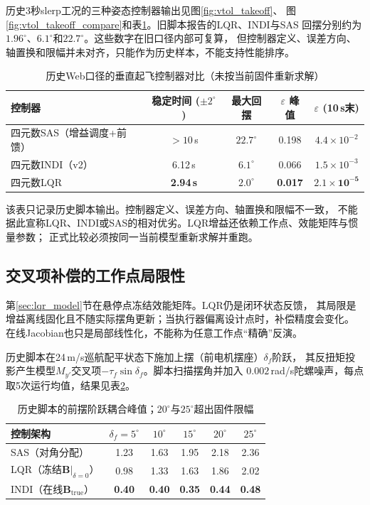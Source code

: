 历史3秒slerp工况的三种姿态控制器输出见图\ref{fig:vtol_takeoff}、
图\ref{fig:vtol_takeoff_compare}和表\ref{tab:ctrl_compare}。旧脚本报告的LQR、INDI与SAS
回摆分别约为$1.96^\circ$、$6.1^\circ$和$22.7^\circ$。这些数字在旧口径内部可复算，
但控制器定义、误差方向、轴置换和限幅并未对齐，只能作为历史样本，不能支持性能排序。

\begin{table}[H]
\centering
\caption{历史Web口径的垂直起飞控制器对比（未按当前固件重新求解）}
\label{tab:ctrl_compare}
\small
\begin{tabular}{l c c c c}
\toprule
\textbf{控制器} & \textbf{稳定时间 ($\pm2^\circ$)} & \textbf{最大回摆} & \textbf{$\varepsilon$ 峰值} & \textbf{$\varepsilon$ (10\,s末)} \\
\midrule
四元数SAS（增益调度+前馈） & $>10$\,s & $22.7^\circ$ & 0.198 & $4.4\times10^{-2}$ \\
四元数INDI（v2） & 6.12\,s & $6.1^\circ$ & 0.066 & $1.5\times10^{-3}$ \\
四元数LQR & \textbf{2.94\,s} & $\mathbf{2.0^\circ}$ & \textbf{0.017} & $\mathbf{2.1\times10^{-5}}$ \\
\bottomrule
\end{tabular}
\end{table}

该表只记录历史脚本输出。控制器定义、误差方向、轴置换和限幅不一致，
不能据此宣称LQR、INDI或SAS的相对优劣。LQR增益还依赖工作点、效能矩阵与惯量参数；
正式比较必须按同一当前模型重新求解并重跑。

\subsection{交叉项补偿的工作点局限性}
\label{sec:lqr_coupling_limit}

第\ref{sec:lqr_model}节在悬停点冻结效能矩阵。LQR仍是闭环状态反馈，
其局限是增益离线固化且不随实际摆角更新；当执行器偏离设计点时，补偿精度会变化。
在线Jacobian也只是局部线性化，不能称为任意工作点“精确”反演。

历史脚本在24\,m/s巡航配平状态下施加上摆（前电机摆座）$\delta_f$阶跃，
其反扭矩投影产生模型$M_{y'}$交叉项$-\tau_f\sin\delta_f$。脚本扫描摆角并加入
$0.002$\,rad/s陀螺噪声，每点取5次运行均值，结果见表\ref{tab:lqr_coupling_deg}。

\begin{table}[H]
\centering
\caption{历史脚本的前摆阶跃耦合峰值；$20^\circ$与$25^\circ$超出固件限幅}
\label{tab:lqr_coupling_deg}
\small
\begin{tabular}{l c c c c c}
\toprule
\textbf{控制架构} & $\delta_f=5^\circ$ & $10^\circ$ & $15^\circ$ & $20^\circ$ & $25^\circ$ \\
\midrule
SAS（对角分配） & 1.23 & 1.63 & 1.95 & 2.18 & 2.36 \\
LQR（冻结$\mathbf{B}|_{\delta=0}$） & 0.98 & 1.33 & 1.63 & 1.86 & 2.02 \\
INDI（在线$\mathbf{B}_{\mathrm{true}}$） & \textbf{0.40} & \textbf{0.40} & \textbf{0.35} & \textbf{0.44} & \textbf{0.48} \\
\bottomrule
\end{tabular}
\end{table}

